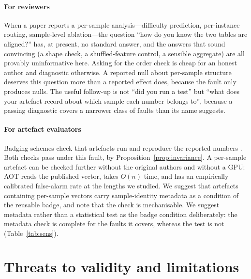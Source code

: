 \documentclass[a4paper,fleqn]{cas-sc}
\begin{document}
\paragraph{For reviewers}
When a paper reports a per-sample analysis---difficulty prediction, per-instance
routing, sample-level ablation---the question ``how do you know the two tables are
aligned?'' has, at present, no standard answer, and the answers that sound
convincing (a shape check, a shuffled-feature control, a sensible aggregate) are
all provably uninformative here. Asking for the order check is cheap for an honest
author and diagnostic otherwise. A reported null about per-sample structure
deserves this question more than a reported effect does, because the fault only
produces nulls. The useful follow-up is not ``did you run a test'' but ``what does
your artefact record about which sample each number belongs to'', because a passing
diagnostic covers a narrower class of faults than its name suggests.

\paragraph{For artefact evaluators}
Badging schemes check that artefacts run and reproduce the reported numbers
\citep{acmbadging,pineau2021,gundersen2018}. Both checks pass under this fault, by
Proposition~\ref{prop:invariance}. A per-sample artefact can be checked further
without the original authors and without a GPU: AOT reads the published vector,
takes $O(n)$ time, and has an empirically calibrated false-alarm rate at the
lengths we studied. We suggest that
artefacts containing per-sample vectors carry sample-identity metadata as a
condition of the
reusable badge, and note that the check is mechanisable. We suggest metadata rather
than a statistical test as the badge condition deliberately: the metadata check is
complete for the faults it covers, whereas the test is not
(Table~\ref{tab:sens}).

\section{Threats to validity and limitations}
\label{sec:threats}
\label{sec:limits}
\end{document}
